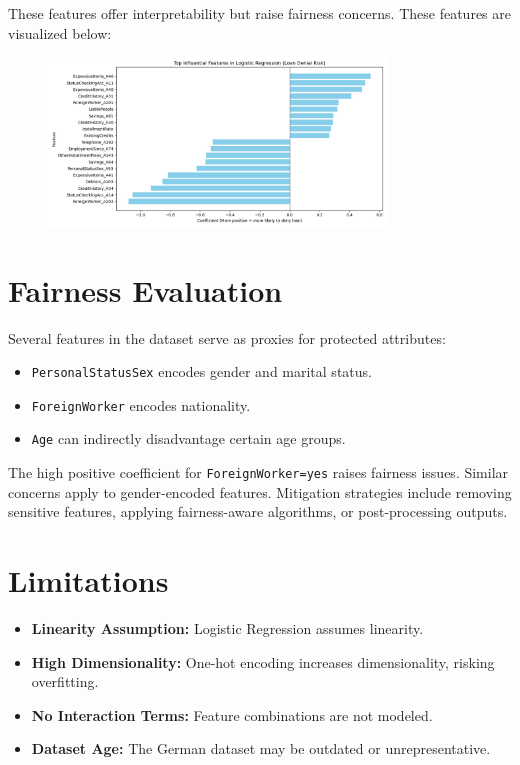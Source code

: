 \documentclass[12pt]{article}
\begin{document}
	These features offer interpretability but raise fairness concerns. These features are visualized below:
	
	\begin{figure}[h]
		\centering
		\includegraphics[width=0.8\textwidth]{InfluentialFeatures.png}
		\label{fig:top_features}
	\end{figure}
	
	\section{Fairness Evaluation}
	Several features in the dataset serve as proxies for protected attributes:
	\begin{itemize}
		\item \texttt{PersonalStatusSex} encodes gender and marital status.
		\item \texttt{ForeignWorker} encodes nationality.
		\item \texttt{Age} can indirectly disadvantage certain age groups.
	\end{itemize}
	
	The high positive coefficient for \texttt{ForeignWorker=yes} raises fairness issues. Similar concerns apply to gender-encoded features. Mitigation strategies include removing sensitive features, applying fairness-aware algorithms, or post-processing outputs.
	
	\section{Limitations}
	\begin{itemize}
		\item \textbf{Linearity Assumption:} Logistic Regression assumes linearity.
		\item \textbf{High Dimensionality:} One-hot encoding increases dimensionality, risking overfitting.
		\item \textbf{No Interaction Terms:} Feature combinations are not modeled.
		\item \textbf{Dataset Age:} The German dataset may be outdated or unrepresentative.
	\end{itemize}
	
\end{document}
